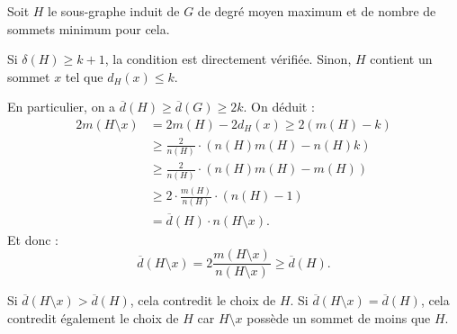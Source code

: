 \documentclass[11pt,a4paper]{article}
\newcommand{\ol}[1]{\overline{#1}}
\theoremstyle{break}
\begin{document}
\begin{td-sol}
    Soit \(H\) le sous-graphe induit de \(G\) de degré moyen maximum et de nombre de sommets minimum pour cela.

    Si \(\delta(H) \geq k + 1\), la condition est directement vérifiée. Sinon, \(H\) contient un sommet \(x\) tel que \(d_H(x) \leq k\).

    En particulier, on a \(\ol{d}(H) \geq \ol{d}(G) \geq 2k\). On déduit :
    \begin{equation*}
        \begin{aligned}
            2m(H \setminus x) &= 2m(H) - 2d_H(x) \geq 2(m(H) - k) \\
            &\geq \frac{2}{n(H)} \cdot \left(n(H) m(H) - n(H) k\right) \\
            &\geq \frac{2}{n(H)} \cdot \left(n(H) m(H) - m(H)\right) \\
            &\geq 2 \cdot \frac{m(H)}{n(H)} \cdot (n(H) - 1) \\
            &= \ol{d}(H) \cdot n(H \setminus x).
        \end{aligned}
    \end{equation*}
    Et donc :
    \begin{equation*}
        \ol{d}(H \setminus x) = 2 \frac{m(H \setminus x)}{n(H \setminus x)} \geq \ol{d}(H).
    \end{equation*}

    Si \(\ol{d}(H \setminus x) > \ol{d}(H)\), cela contredit le choix de \(H\).
    Si \(\ol{d}(H \setminus x) = \ol{d}(H)\), cela contredit également le choix de \(H\) car \(H \setminus x\) possède un sommet de moins que \(H\).
\end{td-sol}
\end{document}

